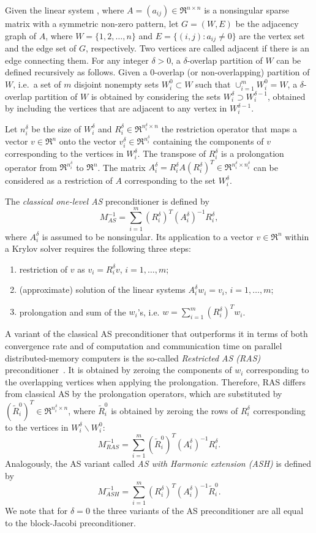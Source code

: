 Given the linear system ,
where $A=(a_{ij}) \in \Re^{n \times n}$ is a
nonsingular sparse matrix with a symmetric non-zero pattern,
let $G=(W,E)$ be the adjacency graph of $A$, where $W=\{1, 2, \ldots, n\}$
and $E=\{(i,j) : a_{ij} \neq 0\}$ are the vertex set and the edge set of $G$,
respectively. Two vertices are called adjacent if there is an edge connecting
them. For any integer $\delta > 0$, a $\delta$-overlap
partition of $W$ can be defined recursively as follows.
Given a 0-overlap (or non-overlapping) partition of $W$,
i.e.\ a set of $m$ disjoint nonempty sets $W_i^0 \subset W$ such that
$\cup_{i=1}^m W_i^0 = W$, a $\delta$-overlap
partition of $W$ is obtained by considering the sets
$W_i^\delta \supset W_i^{\delta-1}$, obtained by including the vertices that
are adjacent to any vertex in $W_i^{\delta-1}$.

Let $n_i^\delta$ be the size of $W_i^\delta$ and $R_i^{\delta} \in 
\Re^{n_i^\delta \times n}$ the restriction operator that maps
a vector $v \in \Re^n$ onto the vector $v_i^{\delta} \in \Re^{n_i^\delta}$
containing the components of $v$ corresponding to the vertices in
$W_i^\delta$. The transpose of $R_i^{\delta}$ is a
prolongation operator from $\Re^{n_i^\delta}$ to $\Re^n$.
The matrix $A_i^\delta=R_i^\delta A (R_i^\delta)^T \in
\Re^{n_i^\delta \times n_i^\delta}$ can be considered
as a restriction of $A$ corresponding to the set $W_i^{\delta}$.

The \emph{classical one-level AS} preconditioner is defined by
\[
M_{AS}^{-1}= \sum_{i=1}^m (R_i^{\delta})^T 
(A_i^\delta)^{-1} R_i^{\delta},
\]
where $A_i^\delta$ is assumed to be nonsingular. Its application
to a vector $v \in \Re^n$ within a Krylov solver requires the following
three steps:
\begin{enumerate}
	\item restriction of $v$ as $v_i = R_i^{\delta} v$, $i=1,\ldots,m$;
	\item (approximate) solution of the linear systems $A_i^\delta w_i = v_i$,
	      $i=1,\ldots,m$;
	\item prolongation and sum of the $w_i$'s, i.e. $w = \sum_{i=1}^m (R_i^{\delta})^T w_i$.
\end{enumerate}
A variant of the classical AS preconditioner that outperforms it
in terms of both convergence rate and of computation and communication
time on parallel distributed-memory computers is the so-called \emph{Restricted AS
(RAS)} preconditioner~\cite{Cai_Sarkis,Efstathiou_Gander}. It
is obtained by zeroing the components of $w_i$ corresponding to the
overlapping vertices when applying the prolongation. Therefore,
RAS differs from classical AS by the prolongation operators,
which are substituted by $(\tilde{R}_i^0)^T \in \Re^{n_i^\delta \times n}$,
where $\tilde{R}_i^0$ is obtained by zeroing the rows of $R_i^\delta$
corresponding to the vertices in $W_i^\delta \backslash W_i^0$:
\[
M_{RAS}^{-1}= \sum_{i=1}^m (\tilde{R}_i^0)^T 
(A_i^\delta)^{-1} R_i^{\delta}.
\]
Analogously, the AS variant called \emph{AS with Harmonic extension (ASH)}
is defined by
\[ M_{ASH}^{-1}= \sum_{i=1}^m (R_i^{\delta})^T 
(A_i^\delta)^{-1} \tilde{R}_i^0.
\]
We note that for $\delta=0$ the three variants of the AS preconditioner are
all equal to the block-Jacobi preconditioner.

